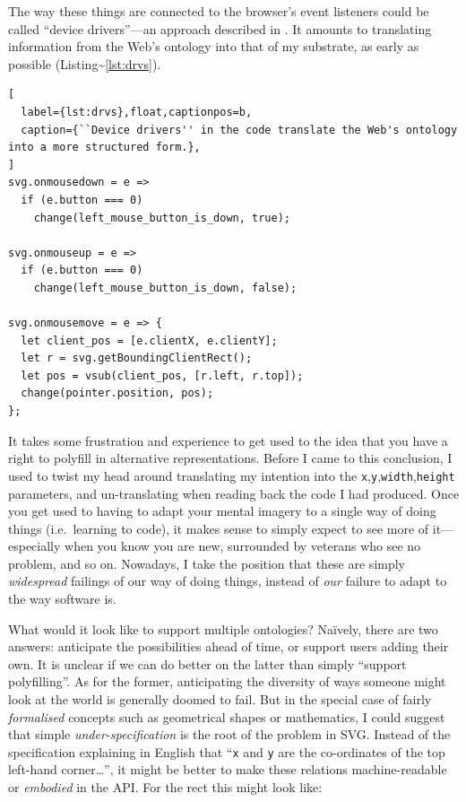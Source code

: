 The way these things are connected to the browser's event listeners
could be called ``device drivers''---an approach described in
\cite{prog21-bbox}. It amounts to translating information from the Web's
ontology into that of my substrate, as early as possible
(Listing\textasciitilde{}\ref{lst:drvs}).

\begin{lstlisting}[
  label={lst:drvs},float,captionpos=b,
  caption={``Device drivers'' in the code translate the Web's ontology into a more structured form.},
]
svg.onmousedown = e =>
  if (e.button === 0)
    change(left_mouse_button_is_down, true);

svg.onmouseup = e =>
  if (e.button === 0)
    change(left_mouse_button_is_down, false);

svg.onmousemove = e => {
  let client_pos = [e.clientX, e.clientY];
  let r = svg.getBoundingClientRect();
  let pos = vsub(client_pos, [r.left, r.top]);
  change(pointer.position, pos);
};
\end{lstlisting}

It takes some frustration and experience to get used to the idea that
you have a right to polyfill in alternative representations. Before I
came to this conclusion, I used to twist my head around translating my
intention into the
\texttt{x},\texttt{y},\texttt{width},\texttt{height}{} parameters, and
un-translating when reading back the code I had produced. Once you get
used to having to adapt your mental imagery to a single way of doing
things (i.e.~learning to code), it makes sense to simply expect to see
more of it---especially when you know you are new, surrounded by
veterans who see no problem, and so on. Nowadays, I take the position
that these are simply \emph{widespread} failings of our way of doing
things, instead of \emph{our} failure to adapt to the way software is.

What would it look like to support multiple ontologies? Naïvely, there
are two answers: anticipate the possibilities ahead of time, or support
users adding their own. It is unclear if we can do better on the latter
than simply ``support polyfilling''. As for the former, anticipating the
diversity of ways someone might look at the world is generally doomed to
fail. But in the special case of fairly \emph{formalised} concepts such
as geometrical shapes or mathematics, I could suggest that simple
\emph{under-specification} is the root of the problem in SVG. Instead of
the specification explaining in English that ``\texttt{x} and \texttt{y}
are the co-ordinates of the top left-hand corner\ldots{}'', it might be
better to make these relations machine-readable or \emph{embodied} in
the API. For the rect this might look like:

